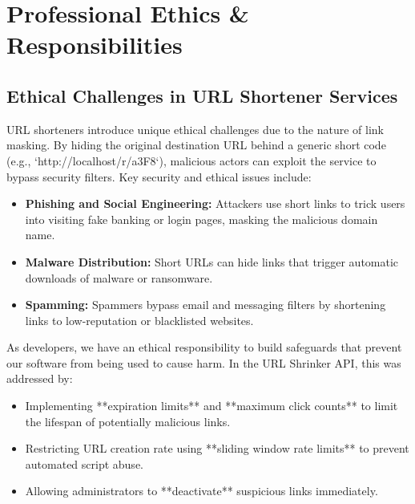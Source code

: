 \chapter{Professional Ethics \& Responsibilities}

\section{Ethical Challenges in URL Shortener Services}
URL shorteners introduce unique ethical challenges due to the nature of link masking. By hiding the original destination URL behind a generic short code (e.g., `http://localhost/r/a3F8`), malicious actors can exploit the service to bypass security filters. Key security and ethical issues include:
\begin{itemize}
    \item \textbf{Phishing and Social Engineering:} Attackers use short links to trick users into visiting fake banking or login pages, masking the malicious domain name.
    \item \textbf{Malware Distribution:} Short URLs can hide links that trigger automatic downloads of malware or ransomware.
    \item \textbf{Spamming:} Spammers bypass email and messaging filters by shortening links to low-reputation or blacklisted websites.
\end{itemize}

As developers, we have an ethical responsibility to build safeguards that prevent our software from being used to cause harm. In the URL Shrinker API, this was addressed by:
\begin{itemize}
    \item Implementing **expiration limits** and **maximum click counts** to limit the lifespan of potentially malicious links.
    \item Restricting URL creation rate using **sliding window rate limits** to prevent automated script abuse.
    \item Allowing administrators to **deactivate** suspicious links immediately.
\end{itemize}

